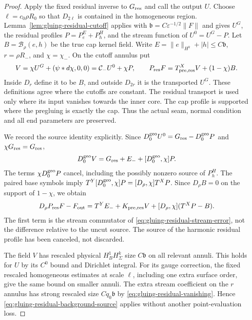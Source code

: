 \documentclass[11pt]{amsart}
\theoremstyle{definition}
\theoremstyle{remark}
\theoremstyle{plain}
\begin{document}
\begin{proof}
Apply the fixed residual inverse to $G_{\rm res}$ and call the
output $U$. Choose $\ell=c_0\rho R_0$ so that $D_{2\ell}$
is contained in the homogeneous region. Lemma~\ref{lem:gluing-residual-cutoff}
applies with $\mathfrak b=C\varepsilon^{-1/2}\|F\|$ and gives
$U^G$, the residual profiles $P=P^E_e+P^H_h$, and the stream
function of $U^0=U^G-P$. Let $B=\mathcal B_\rho(e,h)$ be
the true cap kernel field. Write $E=\|e\|_{H^k}+|h|\leq C\mathfrak b$,
$r=\rho R_-$, and $\chi=\chi_-$. On the cutoff annulus put
\[
 V=\chi U^G+(\psi*d\chi,0,0)=\mathcal C_-U^0+\chi P,
 \qquad
 P_{\rm res}F=T^X_{{\rm pre},{\rm res}}V+(1-\chi)B.
\]
Inside $D_r$ define it to be $B$, and outside $D_{2r}$ it
is the transported $U^G$. These definitions agree where the
cutoffs are constant. The residual transport is used only where
its input vanishes towards the inner core. The cap profile is
supported where the pregluing is exactly the cap. Thus the actual
seam, normal condition and all end parameters are preserved.

We record the source identity explicitly. Since
$D_0^{\rm geo}U^0=G_{\rm res}-D_0^{\rm geo}P$ and
$\chi G_{\rm res}=G_{\rm res}$,
\[
 D_0^{\rm geo}V=G_{\rm res}+E_-+[D_0^{\rm geo},\chi]P.
\]
The terms $\chi D_0^{\rm geo}P$ cancel, including the possibly
nonzero source of $P^H_h$. The paired base symbols imply
$T^Y[D_0^{\rm geo},\chi]P=[D_\rho,\chi]T^XP$.
Since $D_\rho B=0$ on the support of $1-\chi$, we obtain
\begin{equation}\label{eq:gluing-residual-block-identity}
 D_\rho P_{\rm res}F-F_{\rm out}
       =T^YE_-+K_{{\rm pre},{\rm res}}V
                          +[D_\rho,\chi](T^XP-B).
\end{equation}
The first term is the stream commutator of
\eqref{eq:gluing-residual-stream-error}, not the difference
relative to the uncut source. The source of the harmonic residual
profile has been canceled, not discarded.

The field $V$ has rescaled physical $H^1_BH^k_\Sigma$ size
$C\mathfrak b$ on all relevant annuli. This holds for $U$
by its $C^0$ bound and Dirichlet integral. For its gauge correction,
the fixed rescaled homogeneous estimates at scale $\ell$,
including one extra surface order, give the same bound on smaller
annuli. The extra stream coefficient on the $r$ annulus has
strong rescaled size $Cq_0\mathfrak b$ by
\eqref{eq:gluing-residual-vanishing}. Hence
\eqref{eq:gluing-residual-background-source} applies without
another point-evaluation loss.


\end{proof}
\end{document}
